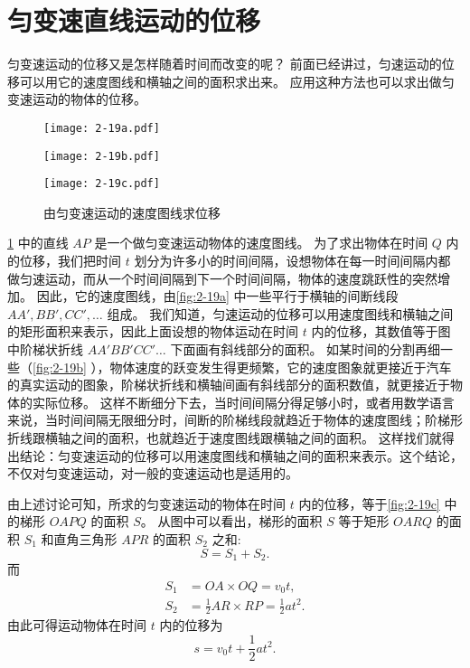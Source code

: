 \section{匀变速直线运动的位移}
匀变速运动的位移又是怎样随着时间而改变的呢？
前面已经讲过，匀速运动的位移可以用它的速度图线和横轴之间的面积求出来。
应用这种方法也可以求出做匀变速运动的物体的位移。

\begin{figure}
  \begin{minipage}[b]{0.33\linewidth}\centering
    \texttt{[image: 2-19a.pdf]}
    \subcaption{}\label{fig:2-19a}
  \end{minipage}%
  \begin{minipage}[b]{0.33\linewidth}\centering
    \texttt{[image: 2-19b.pdf]}
    \subcaption{}\label{fig:2-19b}
  \end{minipage}%
  \begin{minipage}[b]{0.33\linewidth}\centering
    \texttt{[image: 2-19c.pdf]}
    \subcaption{}\label{fig:2-19c}
  \end{minipage}
\caption{由匀变速运动的速度图线求位移}\label{fig:2-19}
\end{figure}

\cref{fig:2-19} 中的直线 $AP$ 是一个做匀变速运动物体的速度图线。
为了求出物体在时间 $Q$ 内的位移，我们把时间 $t$ 划分为许多小的时间间隔，设想物体在每一时间间隔内都做匀速运动，而从一个时间间隔到下一个时间间隔，物体的速度跳跃性的突然增加。
因此，它的速度图线，由\cref{fig:2-19a} 中一些平行于横轴的间断线段 $AA',BB',CC',\ldots$ 组成。
我们知道，匀速运动的位移可以用速度图线和横轴之间的矩形面积来表示，因此上面设想的物体运动在时间 $t$ 内的位移，其数值等于图中阶梯状折线 $AA'BB'CC'\ldots$ 下面画有斜线部分的面积。
如某时间的分割再细一些（\cref{fig:2-19b} ），物体速度的跃变发生得更频繁，它的速度图象就更接近于汽车的真实运动的图象，阶梯状折线和横轴间画有斜线部分的面积数值，就更接近于物体的实际位移。
这样不断细分下去，当时间间隔分得足够小时，或者用数学语言来说，当时间间隔无限细分时，间断的阶梯线段就趋近于物体的速度图线；阶梯形折线跟横轴之间的面积，也就趋近于速度图线跟横轴之间的面积。
这样找们就得出结论：匀变速运动的位移可以用速度图线和横轴之间的面积来表示。这个结论，不仅对匀变速运动，对一般的变速运动也是适用的。

由上述讨论可知，所求的匀变速运动的物体在时间 $t$ 内的位移，等于\cref{fig:2-19c} 中的梯形 $OAPQ$ 的面积 $S$。
从图中可以看出，梯形的面积 $S$ 等于矩形 $OARQ$ 的面积 $S_1$ 和直角三角形 $APR$ 的面积 $S_2$ 之和:
\[S=S_1+S_2.\]
而
\[\begin{split}
S_1&=OA\times OQ=v_0 t,\\
S_2&=\frac{1}{2}AR\times RP=\frac{1}{2}at^2.
\end{split}\]
由此可得运动物体在时间 $t$ 内的位移为
\[s=v_0t+\frac{1}{2}at^2.\]

